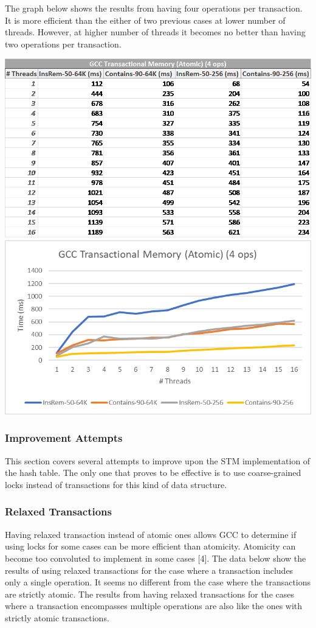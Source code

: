 \documentclass[11pt]{article} %
\begin{document}
The graph below shows the results from having four operations per transaction. It is more efficient than the either of two previous cases at lower number of threads. However, at higher number of threads it becomes no better than having two operations per transaction.

\bigskip
\includegraphics[width=0.5\linewidth]{Table3.png}
\includegraphics[width=0.5\linewidth]{Graph3.png}

\subsubsection{Improvement Attempts}

This section covers several attempts to improve upon the STM implementation of the hash table. The only one that proves to be effective is to use coarse-grained locks instead of transactions for this kind of data structure.

\subsubsection{Relaxed Transactions}

Having relaxed transaction instead of atomic ones allows GCC to determine if using locks for some cases can be more efficient than atomicity. Atomicity can become too convoluted to implement in some cases [4]. The data below show the results of using relaxed transactions for the case where a transaction includes only a single operation. It seems no different from the case where the transactions are strictly atomic. The results from having relaxed transactions for the cases where a transaction encompasses multiple operations are also like the ones with strictly atomic transactions.
\end{document}

